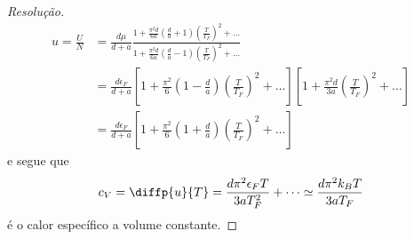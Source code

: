 \begin{proof}[Resolução]
\begin{align*}
        u = \frac{U}{N} &= \frac{d\mu}{d + a}  \frac{1 + \frac{\pi^2d}{6a}\left(\frac{d}{a} + 1\right)\left(\frac{T}{T_F}\right)^2 + \dots}{1 + \frac{\pi^2 d}{6a}\left(\frac{d}{a} - 1\right)\left(\frac{T}{T_F}\right)^2 + \dots}\\
                        &= \frac{d \epsilon_F}{d + a} \left[1 + \frac{\pi^2}{6}\left(1 - \frac{d}{a}\right)\left(\frac{T}{T_F}\right)^2 + \dots\right]\left[1 + \frac{\pi^2 d}{3a}\left(\frac{T}{T_F}\right)^2+ \dots\right]\\
                        &= \frac{d \epsilon_F}{d + a}\left[1 + \frac{\pi^2}{6}\left(1 + \frac{d}{a}\right)\left(\frac{T}{T_F}\right)^2 + \dots\right]
    \end{align*}
    e segue que
    \begin{equation*}
        c_V = \diffp{u}{T} = \frac{d\pi^2\epsilon_F T}{3aT_F^2} + \dots \simeq \frac{d \pi^2 k_B T}{3aT_F}
    \end{equation*}
    é o calor específico a volume constante.
\end{proof}
